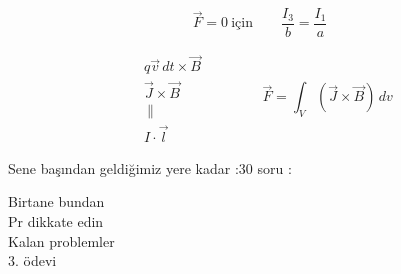 \documentclass[11pt,a4paper]{article}
\begin{document}
\[ \vec{F} = 0 \ \text{için} \qquad \frac{I_3}{b} = \frac{I_1}{a} \]

\[ \begin{aligned} &q\vec{v}\,dt\times\vec{B} \\ &\vec{J}\times\vec{B} \\ &\ \| \\ &I\cdot\vec{l} \end{aligned} \qquad\qquad \vec{F} = \int_V(\vec{J}\times\vec{B})\,dv \]

\noindent Sene başından geldiğimiz yere kadar :30  soru \qquad {}:

\noindent Birtane bundan\\
Pr dikkate edin\\
Kalan problemler\\
3. ödevi 
\end{document}

